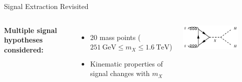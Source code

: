 \documentclass[11pt, xcolor={dvipsnames}, aspectratio=169, notes]{beamer}
\begin{document}


\begin{frame}{Signal Extraction Revisited}
  \begin{columns}[onlytextwidth]

    \vspace*{0.2em}

    \textbf{Multiple signal hypotheses considered:}
    \begin{itemize}
    \item 20 mass points ($\SI{251}{\GeV} \leq m_{X} \leq \SI{1.6}{\TeV}$)
    \item Kinematic properties of signal changes with $m_{X}$
    \end{itemize}



    \vspace*{1.5em}



    \vspace*{1em}


    \centering

    \hspace*{1em}\includegraphics[width=0.75\textwidth]{feynman_graphs/di_higgs_resonant}


\end{columns}
\end{frame}
\end{document}
